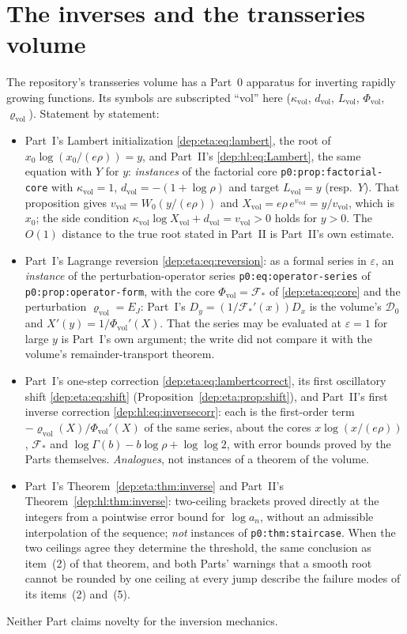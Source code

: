 \documentclass[11pt]{article}
\theoremstyle{definition}\newtheorem{definition}[theorem]{Definition}
\theoremstyle{remark}\newtheorem{remark}[theorem]{Remark}
\newcommand{\file}[1]{\nolinkurl{#1}}
\newcommand{\vol}{\mathrm{vol}}
\begin{document}
\section*{The inverses and the transseries volume}\label{dep:sec:inverses}
The repository's transseries volume \cite{tsvol} has a Part~0 apparatus for
inverting rapidly growing functions. Its symbols are subscripted ``vol''
here ($\kappa_\vol$, $d_\vol$, $L_\vol$, $\Phi_\vol$, $\varrho_\vol$).
Statement by statement:
\begin{itemize}
\item Part~I's Lambert initialization \eqref{dep:eta:eq:lambert}, the root of
$x_0\log(x_0/(e\rho))=y$, and Part~II's \eqref{dep:hl:eq:Lambert}, the same
equation with $Y$ for $y$: \emph{instances} of the factorial core
\file{p0:prop:factorial-core} with $\kappa_\vol=1$, $d_\vol=-(1+\log\rho)$ and
target $L_\vol=y$ (resp.\ $Y$). That proposition gives
$v_\vol=W_0(y/(e\rho))$ and $X_\vol=e\rho\,e^{v_\vol}=y/v_\vol$, which is
$x_0$; the side condition $\kappa_\vol\log X_\vol+d_\vol=v_\vol>0$ holds for
$y>0$. The $O(1)$ distance to the true root stated in Part~II is Part~II's own
estimate.
\item Part~I's Lagrange reversion \eqref{dep:eta:eq:reversion}: as a formal
series in $\varepsilon$, an \emph{instance} of the perturbation-operator
series \file{p0:eq:operator-series} of \file{p0:prop:operator-form}, with the
core $\Phi_\vol=\mathcal F_*$ of \eqref{dep:eta:eq:core} and the perturbation
$\varrho_\vol=E_J$: Part~I's $D_y=(1/\mathcal F_*'(x))D_x$ is the volume's
$\mathscr D_0$ and $X'(y)=1/\Phi_\vol'(X)$. That the series may be evaluated
at $\varepsilon=1$ for large $y$ is Part~I's own argument; the write did not
compare it with the volume's remainder-transport theorem.
\item Part~I's one-step correction \eqref{dep:eta:eq:lambertcorrect}, its
first oscillatory shift \eqref{dep:eta:eq:shift} (Proposition~\ref{dep:eta:prop:shift}),
and Part~II's first inverse correction \eqref{dep:hl:eq:inversecorr}: each is
the first-order term $-\varrho_\vol(X)/\Phi_\vol'(X)$ of the same series, about
the cores $x\log(x/(e\rho))$, $\mathcal F_*$ and
$\log\Gamma(b)-b\log\rho+\log\log2$, with error bounds proved by the Parts
themselves. \emph{Analogues}, not instances of a theorem of the volume.
\item Part~I's Theorem~\ref{dep:eta:thm:inverse} and Part~II's
Theorem~\ref{dep:hl:thm:inverse}: two-ceiling brackets proved directly at the
integers from a pointwise error bound for $\log a_n$, without an admissible
interpolation of the sequence; \emph{not} instances of
\file{p0:thm:staircase}. When the two ceilings agree they determine the
threshold, the same conclusion as item~(2) of that theorem, and both Parts'
warnings that a smooth root cannot be rounded by one ceiling at every jump
describe the failure modes of its items~(2) and~(5).
\end{itemize}
Neither Part claims novelty for the inversion mechanics.
\end{document}
